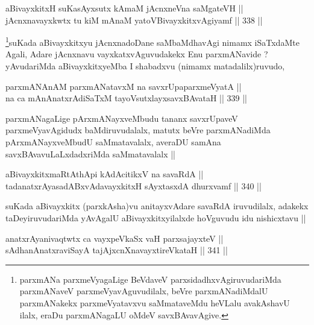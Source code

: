 \begin{shl}
aBivayxkitxH suKasAyxsutx kAmaM jAcnxneVna saMgateVH || \\
jAcnxnavayxkwtx tu kiM mAnaM yatoV\s BivayxkitxvAgiyamf ||  338 ||  
\end{shl}

\begin{artha}
\footnote{parxmANa parxmeVyagaLige BeVdaveV parxsidadhxvAgiruvudariMda
  parxmANaveV parxmeVyavAguvudilalx, beVre parxmANadiMdalU
  parxmANakekx parxmeVyatavxvu saMmataveMdu heVLalu avakAshavU ilalx,
  eraDu parxmANagaLU oMdeV savxBAvavAgive.}suKada aBivayxkitxyu jAcnxnadoDane saMbaMdhavAgi nimamx
iSaTxdaMte Agali, Adare jAcnxnavu vayxkatxvAguvudakekx Enu
parxmANavide ? yAvudariMda aBivayxkitxyeMba I shabadxvu (nimamx
matadalilx)ruvudo, 
\end{artha}


\begin{shl}
parxmANAnAM parxmANatavxM na savxrUpaparxmeVyatA || \\
na ca mAnAnatxrAdiSaTxM tayoVsutxlayxsavxBAvataH ||  339 ||  
\end{shl}

\begin{artha}
parxmANagaLige pArxmANayxveMbudu tananx savxrUpaveV parxmeVyavAgidudx
baMdiruvudalalx, matutx beVre parxmANadiMda pArxmANayxveMbudU
saMmatavalalx, averaDU samAna savxBAvavuLaLxdadxriMda saMmatavalalx ||
\end{artha}


\begin{shl}
aBivayxkitxmaRtA\s thApi kAdAcitikxV na savaRdA || \\
tadanatxrAyasadABxvAdavayxkitxH sAyxtasxdA dhurxvamf ||  340 ||  
\end{shl}

\begin{artha}
suKada aBivayxkitx (parxkAsha)vu anitayxvAdare savaRdA iruvudilalx,
adakekx taDeyiruvudariMda yAvAgalU aBivayxkitxyilalxde hoVguvudu idu
nishicxtavu ||
\end{artha}


\begin{shl}
anatxrAyanivaqtwtx ca vayxpeVkaSx vaH parxsajayxteV ||  \\
sAdhanAnatxraviSayA tajAjxcnXnavayxtireVkataH ||  341 ||  
\end{shl}


